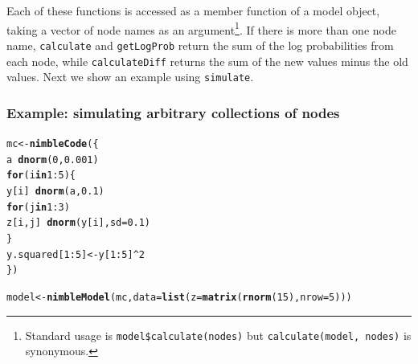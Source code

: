 \documentclass[12pt,oneside]{book}\usepackage[]{graphicx}\usepackage[]{color}
\makeatletter
\newcommand{\hlnum}[1]{\textcolor[rgb]{0.686,0.059,0.569}{#1}}%
\newcommand{\hlopt}[1]{\textcolor[rgb]{0,0,0}{#1}}%
\newcommand{\hlstd}[1]{\textcolor[rgb]{0.345,0.345,0.345}{#1}}%
\newcommand{\hlkwa}[1]{\textcolor[rgb]{0.161,0.373,0.58}{\textbf{#1}}}%
\newcommand{\hlkwb}[1]{\textcolor[rgb]{0.69,0.353,0.396}{#1}}%
\newcommand{\hlkwc}[1]{\textcolor[rgb]{0.333,0.667,0.333}{#1}}%
\newcommand{\hlkwd}[1]{\textcolor[rgb]{0.737,0.353,0.396}{\textbf{#1}}}%
\newenvironment{kframe}{%
 \def\at@end@of@kframe{}%
 \ifinner\ifhmode%
  \def\at@end@of@kframe{\end{minipage}}%
  \begin{minipage}{\columnwidth}%
 \fi\fi%
 \def\FrameCommand##1{\hskip\@totalleftmargin \hskip-\fboxsep
 \colorbox{shadecolor}{##1}\hskip-\fboxsep
     \hskip-\linewidth \hskip-\@totalleftmargin \hskip\columnwidth}%
 \MakeFramed {\advance\hsize-\width
   \@totalleftmargin\z@ \linewidth\hsize
   \@setminipage}}%
 {\par\unskip\endMakeFramed%
 \at@end@of@kframe}
\newenvironment{knitrout}{}{} %
\def\cd#1{\texttt{#1}}
\makeatother
\begin{document}
Each of these functions is accessed as a member function of a model
object, taking a vector of node names as an argument\footnote{Standard usage is \cd{model\$calculate(nodes)} but \cd{calculate(model, nodes)} is synonymous.}.   If there is
more than one node name, \cd{calculate} and \cd{getLogProb} return the
sum of the log probabilities from each node, while \cd{calculateDiff}
returns the sum of the new values minus the old values.  Next we show
an example using \cd{simulate}.


\subsubsection{Example: simulating arbitrary collections of nodes}
\label{sec:arbitr-coll-nodes}

\begin{knitrout}
\color{fgcolor}\begin{kframe}
\begin{alltt}
\hlstd{mc} \hlkwb{<-} \hlkwd{nimbleCode}\hlstd{(\{}
    \hlstd{a} \hlopt{~} \hlkwd{dnorm}\hlstd{(}\hlnum{0}\hlstd{,} \hlnum{0.001}\hlstd{)}
    \hlkwa{for}\hlstd{(i} \hlkwa{in} \hlnum{1}\hlopt{:}\hlnum{5}\hlstd{) \{}
        \hlstd{y[i]} \hlopt{~} \hlkwd{dnorm}\hlstd{(a,} \hlnum{0.1}\hlstd{)}
        \hlkwa{for}\hlstd{(j} \hlkwa{in} \hlnum{1}\hlopt{:}\hlnum{3}\hlstd{)}
            \hlstd{z[i,j]} \hlopt{~} \hlkwd{dnorm}\hlstd{(y[i],} \hlkwc{sd} \hlstd{=} \hlnum{0.1}\hlstd{)}
    \hlstd{\}}
    \hlstd{y.squared[}\hlnum{1}\hlopt{:}\hlnum{5}\hlstd{]} \hlkwb{<-} \hlstd{y[}\hlnum{1}\hlopt{:}\hlnum{5}\hlstd{]}\hlopt{^}\hlnum{2}
\hlstd{\})}

\hlstd{model} \hlkwb{<-} \hlkwd{nimbleModel}\hlstd{(mc,} \hlkwc{data} \hlstd{=} \hlkwd{list}\hlstd{(}\hlkwc{z} \hlstd{=} \hlkwd{matrix}\hlstd{(}\hlkwd{rnorm}\hlstd{(}\hlnum{15}\hlstd{),} \hlkwc{nrow} \hlstd{=} \hlnum{5}\hlstd{)))}


\end{alltt}
\end{kframe}
\end{knitrout}
\end{document}
